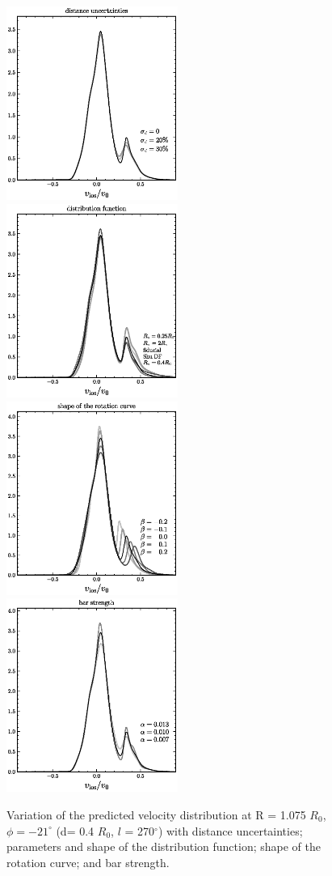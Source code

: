 \documentclass[12pt,preprint]{aastex}
\newcommand{\Ro}{\ensuremath{R_0}}
\begin{document}
\clearpage
\begin{figure}
\includegraphics[width=0.5\textwidth]{distuncertain.ps}
\includegraphics[width=0.5\textwidth]{df.ps}\\
\includegraphics[width=0.5\textwidth]{slope.ps}
\includegraphics[width=0.5\textwidth]{barstrength.ps}
\caption{Variation of the predicted velocity distribution at R = 1.075
  \Ro , $\phi = -21^{\circ}$ (d= 0.4 \Ro, $l$ = 270$^{\circ}$) with
  distance uncertainties; parameters and shape of the distribution
  function; shape of the rotation curve; and bar
  strength.}\label{fig:1dvar}
\end{figure}
\end{document}
